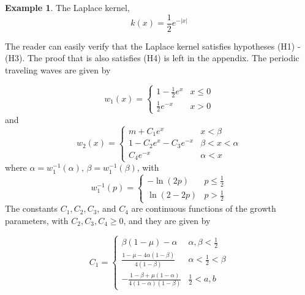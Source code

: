 \documentclass[11pt]{article}
\theoremstyle{definition}
\newtheorem{ex}[thm]{Example}
\numberwithin{equation}{section}
\numberwithin{thm}{section}
\renewcommand{\a}{\alpha}
\renewcommand{\b}{\beta}
\newcommand{\m}{\mu}
\begin{document}
\begin{ex}
The Laplace kernel,
\begin{equation}\label{laplacekernel}
k(x) = \frac{1}{2} e^{-|x|}
\end{equation}

The reader can easily verify that the Laplace kernel satisfies hypotheses (H1) - (H3). The proof that is also satisfies (H4) is left in the appendix. The periodic traveling waves are given by

\begin{equation}
w_1(x) =   \begin{cases} 
1 - \frac{1}{2}e^{x} & x \leq 0 \\
\frac{1}{2}e^{-x} & x > 0
\end{cases}
\end{equation}
and
\begin{equation}
w_2(x) = \begin{cases}
m + C_1 e^x & x < \beta \\
1 - C_2 e^x - C_3 e^{-x} & \beta < x < \alpha \\
C_4 e^{-x} & \alpha < x 
\end{cases} \end{equation}
where $\alpha=w_1^{-1}(\a)$, $\beta=w_1^{-1}(\b)$, with
$$ w_1^{-1}(p) = \begin{cases} -\ln(2p) & p\leq \frac{1}{2} \\ \ln(2-2p) & p > \frac{1}{2} \end{cases} $$
The constants $C_1,C_2,C_3$, and $C_4$ are continuous functions of the growth parameters, with $C_2,C_3,C_4\geq0$, and they are given by
\newcommand{\Conecaseone}{\b(1-\m)-\a}
\newcommand{\Conecasetwo}{\frac{1-\m-4\a(1-\b)}{4(1-\b)}}
\newcommand{\Conecasethree}{- \frac{1-\b+\m(1-\a)}{4(1-\a)(1-\b)} }

\begin{equation}
C_1 = \begin{cases}
\Conecaseone & \a,\b < \frac{1}{2} \\
\Conecasetwo & \a<\frac{1}{2}<\b \\
\Conecasethree & \frac{1}{2}<a,b
\end{cases} \end{equation}


\end{ex}
\end{document}
